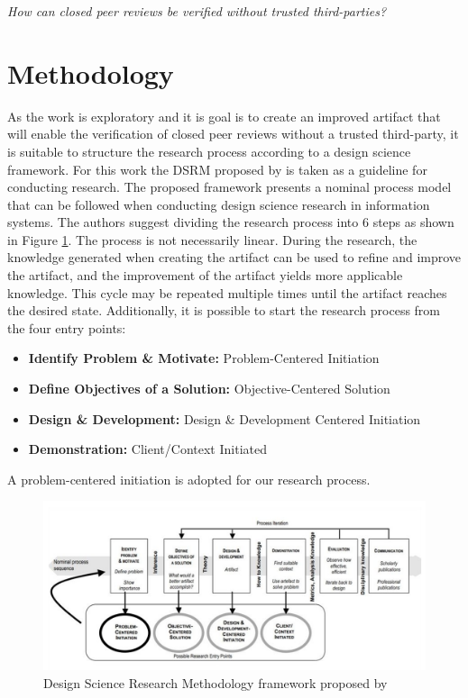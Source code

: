 \begin{center}
    \textit{How can closed peer reviews be verified without trusted third-parties?}
\end{center}

\section{Methodology}

As the work is exploratory and it is goal is to create an improved artifact that will enable the verification of closed peer reviews without a trusted third-party, it is suitable to structure the research process according to a design science framework. For this work the \acrfull{DSRM} proposed by \cite{Peffers.2007} is taken as a guideline for conducting research. The proposed framework presents a nominal process model that can be followed when conducting design science research in information systems. The authors suggest dividing the research process into 6 steps as shown in Figure \ref{fig:dsrm}. The process is not necessarily linear. During the research, the knowledge generated when creating the artifact can be used to refine and improve the artifact, and the improvement of the artifact yields more applicable knowledge. This cycle may be repeated multiple times until the artifact reaches the desired state. Additionally, it is possible to start the research process from the four entry points:

\begin{itemize}
    \item \textbf{Identify Problem \& Motivate:} Problem-Centered Initiation
    \item \textbf{Define Objectives of a Solution:} Objective-Centered Solution
    \item \textbf{Design \& Development:} Design \& Development Centered Initiation
    \item \textbf{Demonstration:} Client/Context Initiated
\end{itemize}

A problem-centered initiation is adopted for our research process. 

\begin{figure}[htpb]
  \centering
  \includegraphics[width=\textwidth]{figures/dsrm.png}
  \caption{Design Science Research Methodology framework proposed by \cite{Peffers.2007}} \label{fig:dsrm}
\end{figure}

